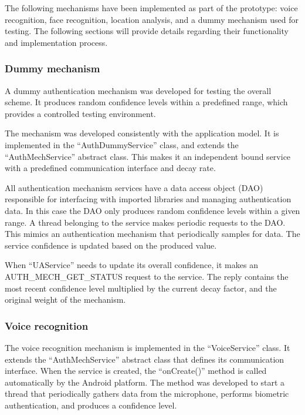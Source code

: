 The following mechanisms have been implemented as part of the prototype: voice recognition, face recognition, location analysis, and a dummy mechanism used for testing. The following sections will provide details regarding their functionality and implementation process.

\subsubsection{Dummy mechanism}
A dummy authentication mechanism was developed for testing the overall scheme. It produces random confidence levels within a predefined range, which provides a controlled testing environment.

The mechanism was developed consistently with the application model. It is implemented in the ``AuthDummyService'' class, and extends the ``AuthMechService'' abstract class. This makes it an independent bound service with a predefined communication interface and decay rate.

All authentication mechanism services have a data access object (DAO) responsible for interfacing with imported libraries and managing authentication data. In this case the DAO only produces random confidence levels within a given range. A thread belonging to the service makes periodic requests to the DAO. This mimics an authentication mechanism that periodically samples for data. The service confidence is updated based on the produced value. 

When ``UAService'' needs to update its overall confidence, it makes an AUTH\_MECH\_GET\_STATUS request to the service. The reply contains the most recent confidence level multiplied by the current decay factor, and the original weight of the mechanism. 

\subsubsection{Voice recognition}
The voice recognition mechanism is implemented in the ``VoiceService'' class. It extends the ``AuthMechService'' abstract class that defines its communication interface. When the service is created, the ``onCreate()'' method is called automatically by the Android platform. The method was developed to start a thread that periodically gathers data from the microphone, performs biometric authentication, and produces a confidence level.

